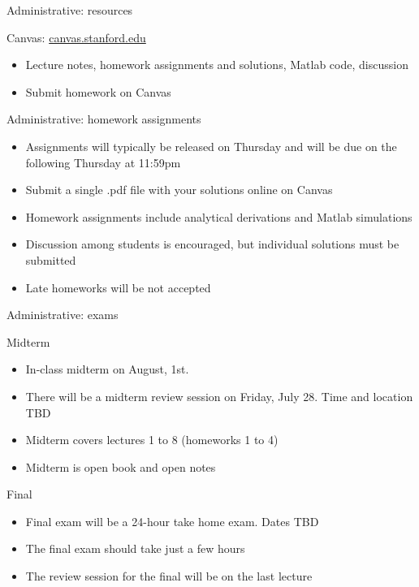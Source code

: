\documentclass[10pt]{beamer}
\begin{document}
\begin{frame}{Administrative: resources}
\begin{block}{Canvas: \href{https://canvas.stanford.edu}{canvas.stanford.edu}}
	\begin{itemize}
		\item Lecture notes, homework assignments and solutions, Matlab code, discussion
		\item Submit homework on Canvas
	\end{itemize}
\end{block}

\end{frame}

%
\begin{frame}{Administrative: homework assignments}

\begin{itemize}
	\item Assignments will typically be released on Thursday and will be due on the following Thursday at 11:59pm
	\item Submit a single .pdf file with your solutions online on Canvas
	\item Homework assignments include analytical derivations and Matlab simulations
	\item Discussion among students is encouraged, but individual solutions must be submitted
	\item Late homeworks will be not accepted
\end{itemize}

\end{frame}

%
\begin{frame}{Administrative: exams}
	
\begin{block}{Midterm}
	\begin{itemize} 
	\item In-class midterm on August, 1st. 
	\item There will be a midterm review session on Friday, July 28. Time and location TBD
	\item Midterm covers lectures 1 to 8 (homeworks 1 to 4)
	\item Midterm is open book and open notes
	\end{itemize}
\end{block}

\begin{block}{Final}
	\begin{itemize} 
	\item Final exam will be a 24-hour take home exam. Dates TBD
	\item The final exam should take just a few hours
	\item The review session for the final will be on the last lecture
	\end{itemize}
\end{block}

\end{frame}
\end{document}
